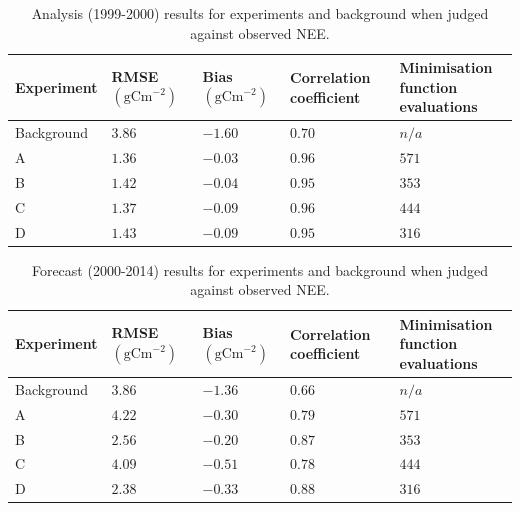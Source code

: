 \documentclass[11pt]{article}
\begin{document}
\begin{table}[ht] 
\begin{center}
	\begin{tabular}{| l | l | l | l | l |}
	\hline
	Experiment & RMSE $( \text{gCm}^{-2})$ & Bias $( \text{gCm}^{-2})$ & Correlation coefficient & \pbox{5cm}{Minimisation function \\ evaluations} \\ \hline
	Background & $3.86$ & $-1.60$ & $0.70$ & $n/a$ \\ \hline
	A & $1.36$ & $-0.03$ & $0.96$ & $571$ \\ \hline
	B & $1.42$ & $-0.04$ & $0.95$ & $353$  \\ \hline
	C & $1.37$ & $-0.09$ & $0.96$ & $444$ \\ \hline
	D & $1.43$ & $-0.09$ & $0.95$ & $316$ \\ 
	\hline
	\end{tabular}
	\caption{Analysis (1999-2000) results for experiments and background when judged against observed NEE.}
	\label{table:exps_tab}
\end{center} 
\end{table}

\begin{table}[ht] 
\begin{center}
	\begin{tabular}{| l | l | l | l | l |}
	\hline
	Experiment & RMSE $( \text{gCm}^{-2})$ & Bias $( \text{gCm}^{-2})$ &  Correlation coefficient & \pbox{6cm}{Minimisation function \\ evaluations} \\ \hline
	Background & $3.86$ & $-1.36$ & $0.66$ & $n/a$ \\ \hline
	A & $4.22$ & $-0.30$ & $0.79$ & $571$ \\ \hline
	B & $2.56$ & $-0.20$ & $0.87$ & $353$  \\ \hline
	C & $4.09$ & $-0.51$ & $0.78$ & $444$ \\ \hline
	D & $2.38$ & $-0.33$ & $0.88$ & $316$ \\ 
	\hline
	\end{tabular}
	\caption{Forecast (2000-2014) results for experiments and background when judged against observed NEE.}
	\label{table:exps_tab}
\end{center} 
\end{table}
\end{document}
